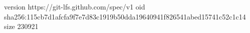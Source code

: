 version https://git-lfs.github.com/spec/v1
oid sha256:115cb7d1afcfa9f7e7d83c1919b50dda19640941f826541abed15741c52c1c14
size 230921
